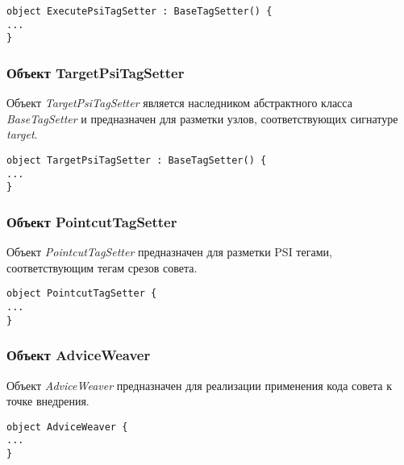 \begin{lstlisting}[style={java}, label={lst:ExecutePsiTagSetter},
  caption={Объект ExecutePsiTagSetter}]
object ExecutePsiTagSetter : BaseTagSetter() {
...
}
\end{lstlisting}
\subsubsection{Объект TargetPsiTagSetter}
\label{ssub:TargetPsiTagSetter}
Объект \textit{TargetPsiTagSetter} является наследником абстрактного класса
\textit{BaseTagSetter} и предназначен для разметки узлов, соответствующих сигнатуре \textit{target}.

\begin{lstlisting}[style={java}, label={lst:TargetPsiTagSetter},
  caption={Объект TargetPsiTagSetter}]
object TargetPsiTagSetter : BaseTagSetter() {
...
}
\end{lstlisting}
\subsubsection{Объект PointcutTagSetter}
\label{ssub:PointcutTagSetter}
Объект \textit{PointcutTagSetter} предназначен для разметки PSI тегами, соответствующим тегам срезов совета.

\begin{lstlisting}[style={java}, label={lst:PointcutTagSetter},
  caption={Объект PointcutTagSetter}]
object PointcutTagSetter {
...
}
\end{lstlisting}
\subsubsection{Объект AdviceWeaver}
\label{ssub:AdviceWeaver}
Объект \textit{AdviceWeaver} предназначен для реализации применения кода совета
к точке внедрения.
\begin{lstlisting}[style={java}, label={lst:AdviceWeaver},
  caption={Объект AdviceWeaver}]
object AdviceWeaver {
...
}
\end{lstlisting}
